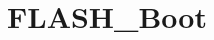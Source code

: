 \hypertarget{group___f_l_a_s_h___boot}{\section{F\-L\-A\-S\-H\-\_\-\-Boot}
\label{group___f_l_a_s_h___boot}
}
